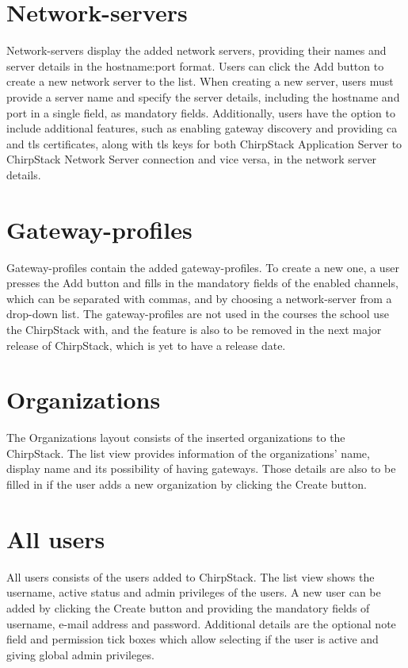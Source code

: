 \section{Network-servers}
Network-servers display the added network servers, providing their names and server details in the hostname:port format.
Users can click the Add button to create a new network server to the list.
When creating a new server, users must provide a server name and specify the server details, including the hostname and port in a single field, as mandatory fields.
Additionally, users have the option to include additional features, such as enabling gateway discovery and providing \gls{ca} and \gls{tls} certificates, along with \gls{tls} keys for both ChirpStack Application Server to ChirpStack Network Server connection and vice versa, in the network server details.

\section{Gateway-profiles}
Gateway-profiles contain the added gateway-profiles.
To create a new one, a user presses the Add button and fills in the mandatory fields of the enabled channels, which can be separated with commas, and by choosing a network-server from a drop-down list.
The gateway-profiles are not used in the courses the school use the ChirpStack with, and the feature is also to be removed in the next major release of ChirpStack, which is yet to have a release date.

\section{Organizations}
The Organizations layout consists of the inserted organizations to the ChirpStack.
The list view provides information of the organizations' name, display name and its possibility of having gateways.
Those details are also to be filled in if the user adds a new organization by clicking the Create button.

\section{All users}
All users consists of the users added to ChirpStack.
The list view shows the username, active status and admin privileges of the users.
A new user can be added by clicking the Create button and providing the mandatory fields of username, e-mail address and password.
Additional details are the optional note field and permission tick boxes which allow selecting if the user is active and giving global admin privileges.


